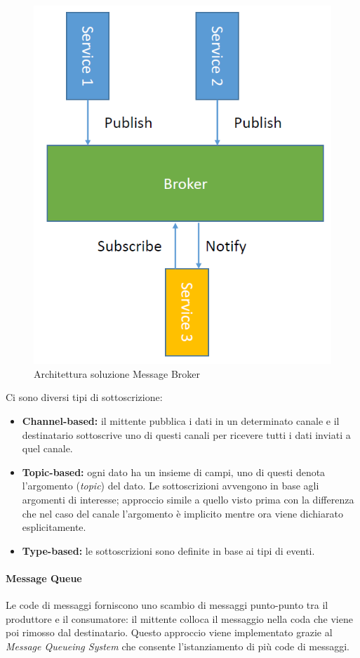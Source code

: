 \documentclass{article}
\begin{document}
\begin{figure}[H]
\centering
\includegraphics[scale=0.5]{img/Broker.PNG}
\caption{Architettura soluzione Message Broker}
\end{figure}

Ci sono diversi tipi di sottoscrizione:
\begin{itemize}
    \item \textbf{Channel-based:} il mittente pubblica i dati in un determinato canale e il destinatario sottoscrive uno di questi canali per ricevere tutti i dati inviati a quel canale.
    \item \textbf{Topic-based:} ogni dato ha un insieme di campi, uno di questi denota l'argomento (\textit{topic}) del dato. Le sottoscrizioni avvengono in base agli argomenti di interesse; approccio simile a quello visto prima con la differenza che nel caso del canale l'argomento è implicito mentre ora viene dichiarato esplicitamente.
    \item \textbf{Type-based:} le sottoscrizioni sono definite in base ai tipi di eventi.
\end{itemize}
\paragraph{Message Queue}
Le code di messaggi forniscono uno scambio di messaggi punto-punto tra il produttore e il consumatore: il mittente colloca il messaggio nella coda che viene poi rimosso dal destinatario. Questo approccio viene implementato grazie al \textit{Message Queueing System} che consente l'istanziamento di più code di messaggi.
\end{document}
